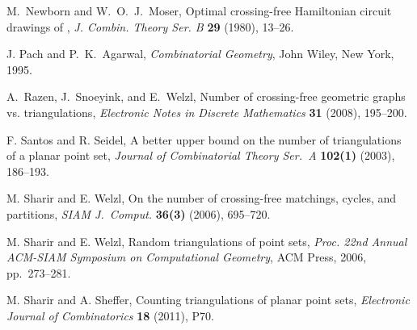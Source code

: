 \documentclass[11pt]{article}
\begin{document}
\begin{thebibliography}{99}
M.~Newborn and W.~O.~J.~Moser,
Optimal crossing-free {H}amiltonian circuit drawings of ,
{\em J. Combin. Theory Ser. B} {\bf 29} (1980), 13--26.

J. Pach and P.~K.~Agarwal,
{\em Combinatorial Geometry},
John Wiley, New York, 1995.


A.~Razen, J.~Snoeyink, and E.~Welzl,
Number of crossing-free geometric graphs vs. triangulations,
\emph{Electronic Notes in Discrete Mathematics}
{\bf 31} (2008), 195--200.

 F. Santos and R. Seidel,
A better upper bound on the number of triangulations of a planar point set,
{\em Journal of Combinatorial Theory Ser.\ A} {\bf 102(1)} (2003),
186--193.


 M. Sharir and E. Welzl,
On the number of crossing-free matchings, cycles, and partitions,
\emph{SIAM J.\ Comput.}
{\bf 36(3)} (2006), 695--720.

 M. Sharir and E. Welzl,
Random triangulations of point sets,
{\it Proc. 22nd Annual ACM-SIAM Symposium on Computational Geometry},
ACM Press, 2006, pp.~273--281.

M. Sharir and A. Sheffer,
Counting triangulations of planar point sets,
{\em Electronic Journal of Combinatorics} {\bf 18} (2011), P70.



\end{thebibliography}
\end{document}
